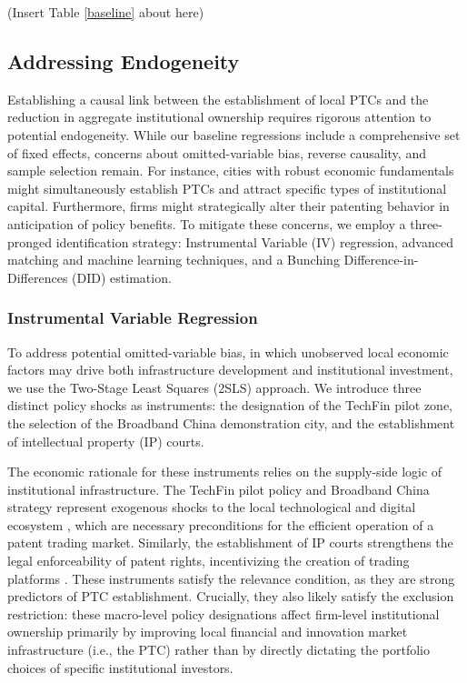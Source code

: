 \documentclass[12pt,a4paper]{article}
\begin{document}
\begin{center}
    (Insert Table \ref{baseline} about here)
\end{center}

\subsection{Addressing Endogeneity}
Establishing a causal link between the establishment of local PTCs and the reduction in aggregate institutional ownership requires rigorous attention to potential endogeneity. While our baseline regressions include a comprehensive set of fixed effects, concerns about omitted-variable bias, reverse causality, and sample selection remain. For instance, cities with robust economic fundamentals might simultaneously establish PTCs and attract specific types of institutional capital. Furthermore, firms might strategically alter their patenting behavior in anticipation of policy benefits. To mitigate these concerns, we employ a three-pronged identification strategy: Instrumental Variable (IV) regression, advanced matching and machine learning techniques, and a Bunching Difference-in-Differences (DID) estimation.

\subsubsection{Instrumental Variable Regression}
To address potential omitted-variable bias, in which unobserved local economic factors may drive both infrastructure development and institutional investment, we use the Two-Stage Least Squares (2SLS) approach. We introduce three distinct policy shocks as instruments: the designation of the TechFin pilot zone, the selection of the Broadband China demonstration city, and the establishment of intellectual property (IP) courts.

The economic rationale for these instruments relies on the supply-side logic of institutional infrastructure. The TechFin pilot policy and Broadband China strategy represent exogenous shocks to the local technological and digital ecosystem \citep{li2025broadband,zhao2025digital}, which are necessary preconditions for the efficient operation of a patent trading market. Similarly, the establishment of IP courts strengthens the legal enforceability of patent rights, incentivizing the creation of trading platforms \citep{fang2017intellectual}. These instruments satisfy the relevance condition, as they are strong predictors of PTC establishment. Crucially, they also likely satisfy the exclusion restriction: these macro-level policy designations affect firm-level institutional ownership primarily by improving local financial and innovation market infrastructure (i.e., the PTC) rather than by directly dictating the portfolio choices of specific institutional investors.
\end{document}
